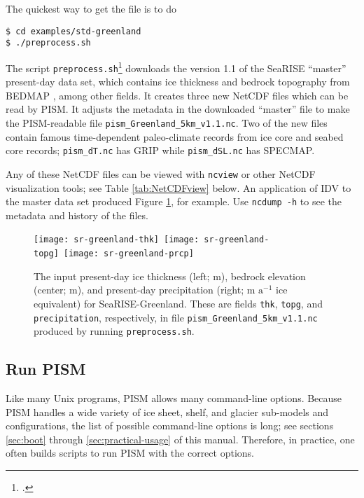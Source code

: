 \centerline{}
\medskip

\noindent The quickest way to get the file is to do
\begin{verbatim}
$ cd examples/std-greenland
$ ./preprocess.sh
\end{verbatim}
\noindent The script \texttt{preprocess.sh}\footnote{.} downloads the version 1.1 of the SeaRISE ``master'' present-day data set, which contains ice thickness and bedrock topography from BEDMAP \cite{BamberLayberryGogenini}, among other fields.  It creates three new NetCDF files which can be read by PISM.  It adjusts the metadata in the downloaded ``master'' file to make the PISM-readable file \texttt{pism_Greenland_5km_v1.1.nc}.  Two of the new files contain famous time-dependent paleo-climate records from ice core and seabed core records; \texttt{pism_dT.nc} has GRIP while \texttt{pism_dSL.nc} has SPECMAP.

Any of these NetCDF files can be viewed with \texttt{ncview} or other NetCDF visualization tools; see Table \ref{tab:NetCDFview} below.  An application of IDV to the master data set produced Figure \ref{fig:sr-input}, for example.  Use \texttt{ncdump -h} to see the metadata and history of the files.

\begin{figure}[ht]
\centering
\mbox{\texttt{[image: sr-greenland-thk]}
  \qquad
  \texttt{[image: sr-greenland-topg]}
  \qquad
  \texttt{[image: sr-greenland-prcp]}}
\caption{The input present-day ice thickness (left; m), bedrock elevation (center; m), and present-day precipitation (right; m $\text{a}^{-1}$ ice equivalent) for SeaRISE-Greenland.  These are fields \texttt{thk}, \texttt{topg}, and \texttt{precipitation}, respectively, in file \texttt{pism_Greenland_5km_v1.1.nc} produced by running \texttt{preprocess.sh}.}
\label{fig:sr-input}
\end{figure}


\subsection{Run PISM}   \label{subsect:runscript}  Like many Unix programs, PISM allows many command-line options.  Because PISM handles a wide variety of ice sheet, shelf, and glacier sub-models and configurations, the list of possible command-line options is long; see sections \ref{sec:boot} through \ref{sec:practical-usage} of this manual.  Therefore, in practice, one often builds scripts to run PISM with the correct options.

